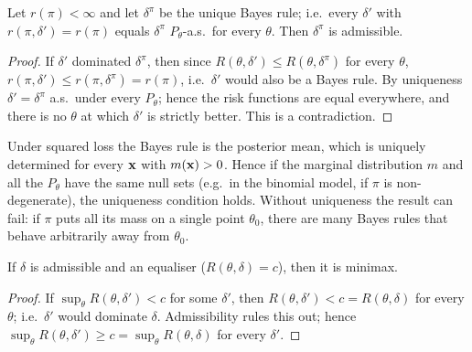 \documentclass[main.tex]{subfiles}
\begin{document}
\begin{theorem}\label{thm:bayes-kabul}
Let $r(\pi)<\infty$ and let $\delta^\pi$ be the unique Bayes rule; i.e.\ every $\delta'$ with $r(\pi,\delta')=r(\pi)$ equals $\delta^\pi$ $P_\theta$-a.s.\ for every $\theta$. Then $\delta^\pi$ is admissible.
\end{theorem}
\begin{proof}
If $\delta'$ dominated $\delta^\pi$, then since $R(\theta,\delta')\le R(\theta,\delta^\pi)$ for every $\theta$, $r(\pi,\delta')\le r(\pi,\delta^\pi)=r(\pi)$, i.e.\ $\delta'$ would also be a Bayes rule. By uniqueness $\delta'=\delta^\pi$ a.s.\ under every $P_\theta$; hence the risk functions are equal everywhere, and there is no $\theta$ at which $\delta'$ is strictly better. This is a contradiction.
\end{proof}

\begin{remark}
Under squared loss the Bayes rule is the posterior mean, which is uniquely determined for every $\mathbf{x}$ with $m(\mathbf{x})>0$. Hence if the marginal distribution $m$ and all the $P_\theta$ have the same null sets (e.g.\ in the binomial model, if $\pi$ is non-degenerate), the uniqueness condition holds. Without uniqueness the result can fail: if $\pi$ puts all its mass on a single point $\theta_0$, there are many Bayes rules that behave arbitrarily away from $\theta_0$.
\end{remark}

\begin{theorem}\label{thm:kabul-esitleyici}
If $\delta$ is admissible and an equaliser ($R(\theta,\delta)=c$), then it is minimax.
\end{theorem}
\begin{proof}
If $\sup_\theta R(\theta,\delta')<c$ for some $\delta'$, then $R(\theta,\delta')<c=R(\theta,\delta)$ for every $\theta$; i.e.\ $\delta'$ would dominate $\delta$. Admissibility rules this out; hence $\sup_\theta R(\theta,\delta')\ge c=\sup_\theta R(\theta,\delta)$ for every $\delta'$.
\end{proof}
\end{document}
